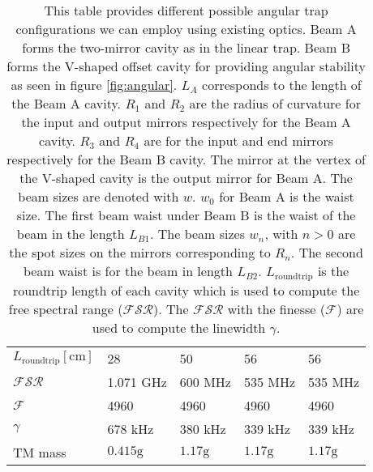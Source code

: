 \begin{table}
\begin{center}
\begin{tabular}{|l|l|l|l|l|}
$L_\mathrm{roundtrip}[\mathrm{cm}]$ & 28& 50        & 56     & 56 \\
$\mathcal{FSR}$ & 1.071 GHz  & 600 MHz     & 535 MHz  & 535 MHz \\
$\mathcal{F}$ & 4960         & 4960        & 4960     & 4960 \\
$\gamma$ & 678 kHz           & 380 kHz     & 339 kHz  & 339 kHz \\
\hline
TM mass  & $0.415\mathrm{g}$ & $1.17\mathrm{g}$ & $1.17\mathrm{g}$ & $1.17\mathrm{g}$ \\
\hline
\end{tabular}
\end{center}
\caption[Angular Trap Parameters]{This table provides different possible
    angular trap configurations we can employ using existing optics.
    Beam A forms the two-mirror cavity as in the linear trap.
    Beam B forms the V-shaped offset cavity for providing angular stability
    as seen in figure \ref{fig:angular}.
    $L_A$ corresponds to the length of the Beam A cavity.
    $R_1$ and $R_2$ are the radius of curvature for the input and output mirrors
    respectively for the Beam A cavity.
    $R_3$ and $R_4$ are for the input and end mirrors respectively for the Beam B
    cavity.
    The mirror at the vertex of the V-shaped cavity is the output mirror for
    Beam A.
    The beam sizes are denoted with $w$. $w_0$ for Beam A is the waist size.
    The first beam waist under Beam B is the waist of the beam
    in the length $L_{B1}$.
    The beam sizes $w_n$, with $n>0$ are the spot sizes on the mirrors
    corresponding to $R_n$.
    The second beam waist is for the beam in length $L_{B2}$.
    $L_\mathrm{roundtrip}$ is the roundtrip length of each cavity which is used
    to compute the free spectral range ($\mathcal{FSR}$).
    The $\mathcal{FSR}$ with the finesse ($\mathcal{F}$) are used to compute the
    linewidth $\gamma$.
    }
\label{tab:angleparams}
\end{table}



